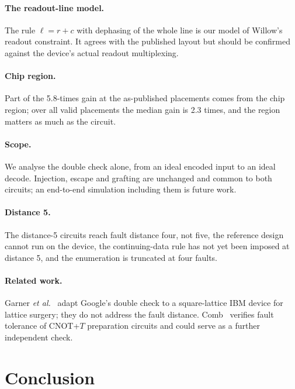 \documentclass[aps,pra,reprint,superscriptaddress,longbibliography]{revtex4-2}
\begin{document}
\paragraph{The readout-line model.}
The rule $\ell=r+c$ with dephasing of the whole line is our model of Willow's readout constraint. It agrees with the published layout but should be confirmed against the device's actual readout multiplexing.

\paragraph{Chip region.}
Part of the 5.8-times gain at the as-published placements comes from the chip region; over all valid placements the median gain is 2.3 times, and the region matters as much as the circuit.

\paragraph{Scope.}
We analyse the double check alone, from an ideal encoded input to an ideal decode. Injection, escape and grafting are unchanged and common to both circuits; an end-to-end simulation including them is future work.

\paragraph{Distance 5.}
The distance-5 circuits reach fault distance four, not five, the reference design cannot run on the device, the continuing-data rule has not yet been imposed at distance 5, and the enumeration is truncated at four faults.

\paragraph{Related work.}
Garner \emph{et al.}~\cite{Garner2026} adapt Google's double check to a square-lattice IBM device for lattice surgery; they do not address the fault distance. Comb~\cite{Simsek2026} verifies fault tolerance of CNOT+$T$ preparation circuits and could serve as a further independent check.

\section{Conclusion}
\end{document}
